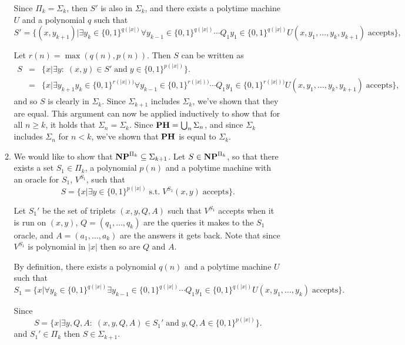 \documentclass[11pt]{article} \usepackage{amssymb}
\begin{document}
\begin{enumerate}
\begin{enumerate}
      Since $\Pi_k=\Sigma_k$, then $S'$ is also in $\Sigma_k$, and there exists a polytime machine
      $U$ and a polynomial $q$ such that 
      \begin{equation*}
        S'=\{(x,y_{k+1})|\exists y_k\in\{0,1\}^{q(|x|)}\forall y_{k-1}\in\{0,1\}^{q(|x|)}\cdots Q_1y_1\in\{0,1\}^{q(|x|)}U(x,y_1,\ldots,y_k,y_{k+1}) \;\mbox{accepts}\},
      \end{equation*}
      
      Let $r(n)=\max(q(n),p(n))$. Then $S$ can be written as 
      \begin{eqnarray*}
        S  &=&\{x|\exists y:\; (x,y)\in S'\;\mbox{and}\;y\in\{0,1\}^{p(|x|)}\}.
        \\ &=&\{x|\exists y_{k+1}y_k\in\{0,1\}^{r(|x|))}\forall y_{k-1}\in\{0,1\}^{r(|x|))}\cdots Q_1y_1\in\{0,1\}^{r(|x|))}U(x,y_1,\ldots,y_k,y_{k+1}) \;\mbox{accepts}\},
      \end{eqnarray*}
      and so $S$ is clearly in $\Sigma_k$. Since $\Sigma_{k+1}$ includes
      $\Sigma_k$, we've shown that they are equal.
      This argument can now be applied
      inductively to show that for all $n\geq k$, it holds that 
      $\Sigma_n=\Sigma_k$. Since ${\bf PH}=\bigcup_n\Sigma_n$, and since $\Sigma_k$ includes $\Sigma_n$ for
      $n<k$, we've shown that
      ${\bf PH}$ is equal to $\Sigma_k$.

      \item
        We would like to show that ${\bf NP}^{\Pi_k}\subseteq \Sigma_{k+1}$. 
        Let $S\in {\bf NP}^{\Pi_k}$, so that there exists a set $S_1\in\Pi_k$, a
        polynomial $p(n)$ and
        a polytime machine with an oracle for $S_1$, $V^{S_1}$, such that
        \begin{equation*}
          S=\{x|\exists y\in\{0,1\}^{p(|x|)}\;\mbox{s.t.}\;V^{S_1}(x,y) \;\mbox{accepts}\}.
        \end{equation*}

        Let $S_1'$ be the set of triplets $(x,y,Q,A)$ such that $V^{S_1}$
        accepts when it 
        is run on $(x,y)$, $Q=(q_1,\ldots,q_k)$ are the queries it makes to 
        the $S_1$ oracle,
        and  $A=(a_1,\ldots,a_k)$ are the answers it gets back. 
        Note that since $V^{S_1}$ is polynomial
        in $|x|$ then so are $Q$ and $A$.

        By definition, there exists a polynomial $q(n)$ and a polytime machine
        $U$ such that
        \begin{equation*}
          S_1=\{x|\forall y_k\in\{0,1\}^{q(|x|)}\exists y_{k-1}\in\{0,1\}^{q(|x|)}\cdots Q_1y_1\in\{0,1\}^{q(|x|)}U(x,y_1,\ldots,y_k) \;\mbox{accepts}\}.
        \end{equation*}

        Since
        \begin{equation*}
          S=\{x|\exists y,Q,A:\; (x,y,Q,A)\in S_1'\;\mbox{and}\;y,Q,A\in\{0,1\}^{p(|x|)}\}.
        \end{equation*}
        and $S_1'\in\Pi_k$ then $S\in\Sigma_{k+1}$.
    \end{enumerate}
    

\end{enumerate}
\end{document}
